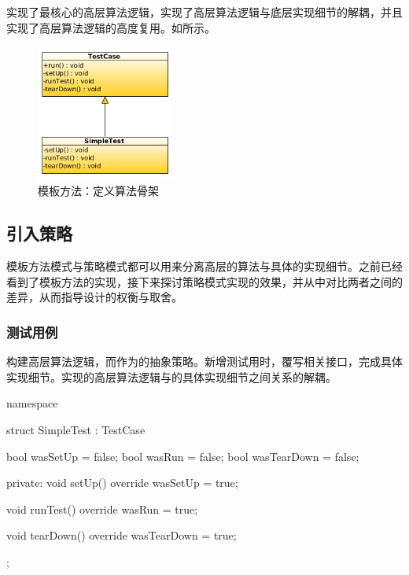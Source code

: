 \begin{content}

实现了最核心的高层算法逻辑，实现了高层算法逻辑与底层实现细节的解耦，并且实现了高层算法逻辑的高度复用。如所示。

\begin{figure}[H]
\centering
\includegraphics[width=0.4\textwidth]{figures/xunit/simple-test.png}
\caption{模板方法：定义算法骨架}
 \label{fig:simple-test}
\end{figure}

\subsection{引入策略}

模板方法模式与策略模式都可以用来分离高层的算法与具体的实现细节。之前已经看到了模板方法的实现，接下来探讨策略模式实现的效果，并从中对比两者之间的差异，从而指导设计的权衡与取舍。

\subsubsection{测试用例}

构建高层算法逻辑，而作为的抽象策略。新增测试用时，覆写相关接口，完成具体实现细节。实现的高层算法逻辑与的具体实现细节之间关系的解耦。

\begin{leftbar}
 \begin{c++}
namespace {
  struct SimpleTest : TestCase {
    bool wasSetUp = false;
    bool wasRun = false;
    bool wasTearDown = false;

  private:
    void setUp() override {
      wasSetUp = true;
    }

    void runTest() override {
      wasRun = true;
    }

    void tearDown() override {
      wasTearDown = true;
    }
  };
}


\end{c++}
\end{leftbar}
\end{content}
